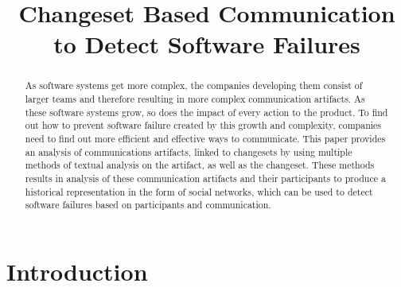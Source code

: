 \documentclass[conference]{IEEEtran}
\begin{document}
\title{Changeset Based Communication to Detect Software Failures}

\author{
}
\maketitle


\begin{abstract}
As software systems get more complex, the companies developing them consist of larger teams and therefore resulting in more complex communication artifacts.  As these software systems grow, so does the impact of every action to the product.  To find out how to prevent software failure created by this growth and complexity, companies need to find out more efficient and effective ways to communicate.  This paper provides an analysis of communications artifacts, linked to changesets by using multiple methods of textual analysis on the artifact, as well as the changeset.  These methods results in analysis of these communication artifacts and their participants to produce a historical representation in the form of social networks, which can be used to detect software failures based on participants and communication.
\end{abstract}

\section{Introduction}
\end{document}
